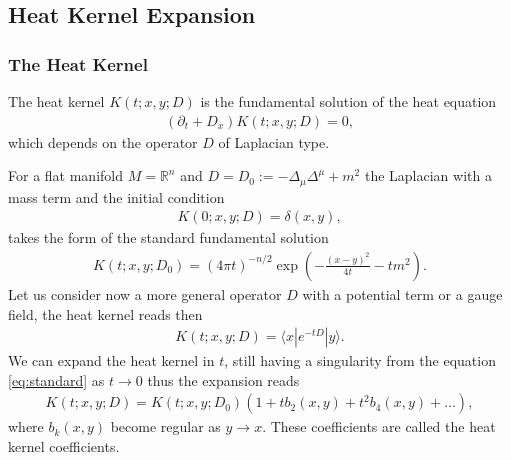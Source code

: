 \subsection{Heat Kernel Expansion}
\subsubsection{The Heat Kernel}
The heat kernel $K(t; x, y; D)$ is the fundamental solution of the heat
equation
\begin{align}
    (\partial _t + D_x)K(t;x, y;D) =0,
\end{align}
which depends on the operator $D$ of Laplacian type.

For a flat manifold $M = \mathbb{R}^n$ and $D = D_0 := -\Delta_\mu\Delta^\mu +m^2$ the
Laplacian with a mass term and the initial condition
\begin{align}
    K(0;x,y;D) = \delta(x,y),
\end{align}
takes the form of the standard fundamental solution
\begin{align}\label{eq:standard}
    K(t;x,y;D_0) = (4\pi t)^{-n/2}\exp\left(-\frac{(x-y)^2}{4t}-tm^2\right).
\end{align}
Let us consider now a more general operator $D$ with a potential term or a
gauge field, the heat kernel reads then
\begin{align}
    K(t;x,y;D) = \langle x|e^{-tD}|y\rangle.
\end{align}
We can expand the heat kernel in $t$, still having a
singularity from the equation \eqref{eq:standard} as $t \rightarrow 0$ thus the
expansion reads
\begin{align}
    K(t;x,y;D) = K(t;x,y;D_0)\left(1 + tb_2(x,y) + t^2b_4(x,y) + \dots
    \right),
\end{align}
where $b_k(x,y)$ become regular as $y \rightarrow x$. These coefficients are called the heat
kernel coefficients.
